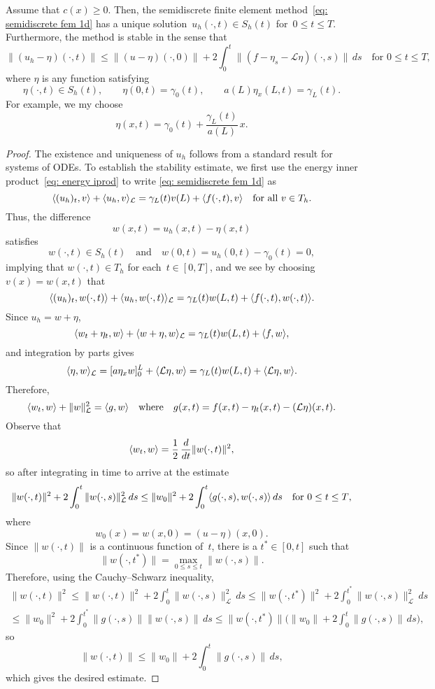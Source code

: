 \begin{theorem}
Assume that $c(x)\ge0$.  Then, the semidiscrete finite element 
method~\eqref{eq: semidiscrete fem 1d} has a unique 
solution~$u_h(\cdot,t)\in S_h(t)$ for~$0\le t\le T$.  Furthermore, the
method is stable in the sense that
\[
\|(u_h-\eta)(\cdot,t)\|\le\|(u-\eta)(\cdot,0)\|
	+2\int_0^t\|(f-\eta_s-\mathcal{L}\eta)(\cdot,s)\|\,ds
	\quad\text{for $0\le t\le T$,}
\]
where $\eta$ is any function satisfying
\[
\eta(\cdot,t)\in S_h(t),\qquad \eta(0,t)=\gamma_0(t),\qquad
	a(L)\eta_x(L,t)=\gamma_L(t).
\]  
For example, we my choose
\[
\eta(x,t)=\gamma_0(t)+\frac{\gamma_L(t)}{a(L)}\,x.
\]
\end{theorem}
\begin{proof}
The existence and uniqueness of $u_h$ follows from a standard result for
systems of ODEs.  To establish the stability estimate, we first
use the energy inner product~\eqref{eq: energy iprod} to write
\eqref{eq: semidiscrete fem 1d} as
\[
\langle(u_h)_t,v\rangle+\langle u_h,v\rangle_{\mathcal{L}}=\gamma_L(t)v(L)
	+\langle f(\cdot,t),v\rangle\quad\text{for all $v\in T_h$.}
\]
Thus, the difference 
\[
w(x,t)=u_h(x,t)-\eta(x,t)
\]
satisfies 
\[
w(\cdot,t)\in S_h(t)\quad\text{and}\quad
w(0,t)=u_h(0,t)-\gamma_0(t)=0,
\]
implying that $w(\cdot,t)\in T_h$ for each~$t\in[0,T]$, and we see by
choosing $v(x)=w(x,t)$ that
\[
\langle(u_h)_t,w(\cdot,t)\rangle+\langle u_h,w(\cdot,t)\rangle_{\mathcal{L}}
	=\gamma_L(t)w(L,t)+\langle f(\cdot,t),w(\cdot,t)\rangle.
\]
Since $u_h=w+\eta$,
\[
\langle w_t+\eta_t,w\rangle+\langle w+\eta,w\rangle_{\mathcal{L}}
	=\gamma_L(t)w(L,t)+\langle f,w\rangle,
\]
and integration by parts gives
\[
\langle\eta,w\rangle_{\mathcal{L}}=[a\eta_xw]_0^L+\langle\mathcal{L}\eta,w\rangle
	=\gamma_L(t)w(L,t)+\langle\mathcal{L}\eta,w\rangle.
\]
Therefore,
\[
\langle w_t,w\rangle+\|w\|_{\mathcal{L}}^2=\langle g,w\rangle
\quad\text{where}\quad g(x,t)=f(x,t)-\eta_t(x,t)-(\mathcal{L}\eta)(x,t).
\]
Observe that
\[
\langle w_t,w\rangle=\frac{1}{2}\,\frac{d}{dt}\|w(\cdot,t)\|^2,
\]
so after integrating in time to arrive at the estimate
\[
\|w(\cdot,t)\|^2+2\int_0^t\|w(\cdot,s)\|_{\mathcal{L}}^2\,ds
\le\|w_0\|^2+2\int_0^t\langle g(\cdot,s),w(\cdot,s)\rangle\,ds
\quad\text{for $0\le t\le T$,}
\]
where 
\[
w_0(x)=w(x,0)=(u-\eta)(x,0).
\]
Since $\|w(\cdot,t)\|$ is a continuous function of~$t$, there is a 
$t^*\in[0,t]$ such that 
\[
\|w(\cdot,t^*)\|=\max_{0\le s\le t}\|w(\cdot,s)\|. 
\]
Therefore, using the Cauchy--Schwarz inequality,
\begin{multline*}
\|w(\cdot,t)\|^2\le\|w(\cdot,t)\|^2+2\int_0^t\|w(\cdot,s)\|_{\mathcal{L}}^2\,ds
\le\|w(\cdot,t^*)\|^2+2\int_0^{t^*}\|w(\cdot,s)\|_{\mathcal{L}}^2\,ds\\
\le\|w_0\|^2+2\int_0^{t^*}\|g(\cdot,s)\|\|w(\cdot,s)\|\,ds
\le\|w(\cdot,t^*)\|\biggl(\|w_0\|+2\int_0^t\|g(\cdot,s)\|\,ds\biggr),
\end{multline*}
so
\[
\|w(\cdot,t)\|\le\|w_0\|+2\int_0^t\|g(\cdot,s)\|\,ds,
\]
which gives the desired estimate.
\end{proof}
